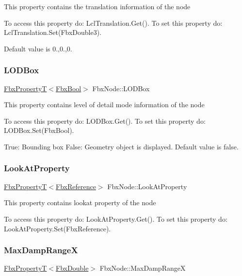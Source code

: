 This property contains the translation information of the node

To access this property do\+: Lcl\+Translation.\+Get(). To set this property do\+: Lcl\+Translation.\+Set(\+Fbx\+Double3).

Default value is 0.,0.,0. \mbox{\label{class_fbx_node_a7f622a4a695494b60221268ec33f54cb}} 
\subsubsection{\texorpdfstring{L\+O\+D\+Box}{LODBox}}
{\footnotesize\ttfamily \hyperlink{class_fbx_property_t}{Fbx\+PropertyT}$<$\hyperlink{fbxtypes_8h_a92e0562b2fe33e76a242f498b362262e}{Fbx\+Bool}$>$ Fbx\+Node\+::\+L\+O\+D\+Box}

This property contains level of detail mode information of the node

To access this property do\+: L\+O\+D\+Box.\+Get(). To set this property do\+: L\+O\+D\+Box.\+Set(\+Fbx\+Bool).

True\+: Bounding box False\+: Geometry object is displayed. Default value is false. \mbox{\label{class_fbx_node_a58a10b7beeedd498ccec72c33fa66079}} 
\subsubsection{\texorpdfstring{Look\+At\+Property}{LookAtProperty}}
{\footnotesize\ttfamily \hyperlink{class_fbx_property_t}{Fbx\+PropertyT}$<$\hyperlink{fbxtypes_8h_a44df6a2eec915cf27cd481e5c5e48a24}{Fbx\+Reference}$>$ Fbx\+Node\+::\+Look\+At\+Property}

This property contains lookat property of the node

To access this property do\+: Look\+At\+Property.\+Get(). To set this property do\+: Look\+At\+Property.\+Set(\+Fbx\+Reference). \mbox{\label{class_fbx_node_acff786d9903523e46826fbdf9cbb5389}} 
\subsubsection{\texorpdfstring{Max\+Damp\+RangeX}{MaxDampRangeX}}
{\footnotesize\ttfamily \hyperlink{class_fbx_property_t}{Fbx\+PropertyT}$<$\hyperlink{fbxtypes_8h_a171e72a1c46fc15c1a6c9c31948c1c5b}{Fbx\+Double}$>$ Fbx\+Node\+::\+Max\+Damp\+RangeX}

